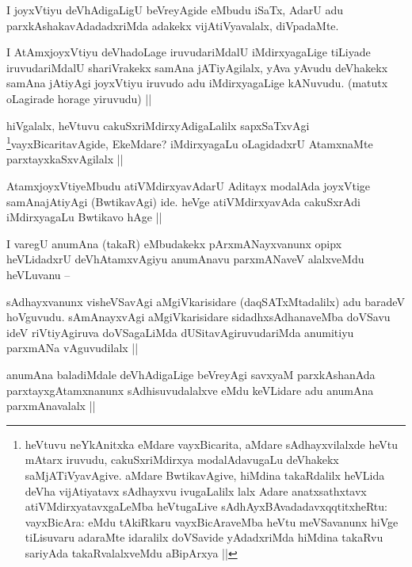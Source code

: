 \begin{artha}
I joyxVtiyu deVhAdigaLigU beVreyAgide eMbudu iSaTx, AdarU adu parxkAshakavAdadadxriMda adakekx vijAtiVyavalalx, diVpadaMte.
\end{artha}

\begin{artha}
I AtAmxjoyxVtiyu deVhadoLage iruvudariMdalU iMdirxyagaLige tiLiyade iruvudariMdalU shariVrakekx samAna jATiyAgilalx, yAva yAvudu deVhakekx samAna jAtiyAgi  joyxVtiyu iruvudo adu iMdirxyagaLige kANuvudu. (matutx oLagirade horage yiruvudu) ||
\end{artha}

\begin{artha}
hiVgalalx, heVtuvu cakuSxriMdirxyAdigaLalilx sapxSaTxvAgi \footnote[1]{heVtuvu neYkAnitxka eMdare vayxBicarita, aMdare sAdhayxvilalxde heVtu mAtarx iruvudu, cakuSxriMdirxya modalAdavugaLu deVhakekx saMjATiVyavAgive. aMdare BwtikavAgive, hiMdina takaRdalilx heVLida deVha vijAtiyatavx sAdhayxvu ivugaLalilx lalx Adare anatxsathxtavx atiVMdirxyatavxgaLeMba heVtugaLive sAdhAyxBAvadadavxqqtitxheRtu: vayxBicAra: eMdu tAkiRkaru vayxBicAraveMba heVtu meVSavanunx hiVge tiLisuvaru adaraMte idaralilx doVSavide yAdadxriMda hiMdina takaRvu sariyAda takaRvalalxveMdu aBipArxya ||}vayxBicaritavAgide, EkeMdare? iMdirxyagaLu oLagidadxrU AtamxnaMte parxtayxkaSxvAgilalx ||
\end{artha}

\begin{artha}
AtamxjoyxVtiyeMbudu atiVMdirxyavAdarU Aditayx modalAda joyxVtige samAnajAtiyAgi (BwtikavAgi) ide. heVge atiVMdirxyavAda cakuSxrAdi iMdirxyagaLu Bwtikavo hAge ||

I varegU anumAna (takaR) eMbudakekx pArxmANayxvanunx opipx heVLidadxrU deVhAtamxvAgiyu anumAnavu parxmANaveV alalxveMdu heVLuvanu --
\end{artha}

\begin{artha}
sAdhayxvanunx visheVSavAgi aMgiVkarisidare (daqSATxMtadalilx) adu baradeV hoVguvudu. sAmAnayxvAgi aMgiVkarisidare sidadhxsAdhanaveMba doVSavu ideV riVtiyAgiruva doVSagaLiMda dUSitavAgiruvudariMda anumitiyu parxmANa vAguvudilalx ||
\end{artha}

\begin{artha}
anumAna baladiMdale deVhAdigaLige beVreyAgi savxyaM parxkAshanAda parxtayxgAtamxnanunx sAdhisuvudalalxve eMdu keVLidare adu anumAna parxmAnavalalx ||
\end{artha}

